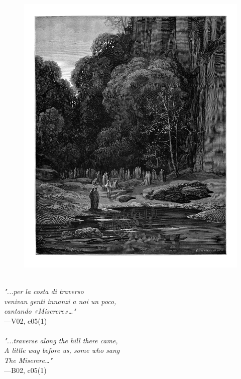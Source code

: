 \documentclass[../Dore_vision.tex]{subfiles}
\begin{document}
\begin{figure}[ht]
\centering
\includegraphics[height=\figsize]{illustrations/book_2/V02, c05(1).jpg}
\end{figure}

\begin{center}
\begin{minipage}{0.8\linewidth}
\textit{\\
"...per la costa di traverso\\venivan genti innanzi a noi un poco,\\cantando «Miserere»…"} \\
—V02, c05(1) \\~\\
\textit{"...traverse along the hill there came,\\A little way before us, some who sang\\The \textquotesingle Miserere\textquotesingle…"} \\
—B02, c05(1)
\end{minipage}
\end{center}
\end{document}
